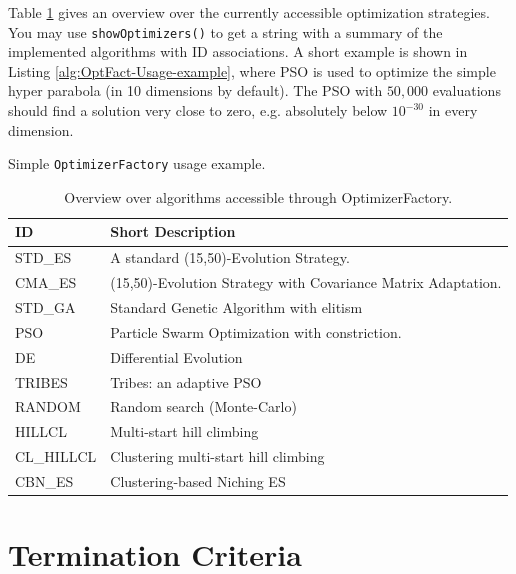 Table \ref{tab:Overview-OptimizerFactory} gives an overview over
the currently accessible optimization strategies. You may use \texttt{showOptimizers()}
to get a string with a summary of the implemented algorithms with
ID associations. A short example is shown in Listing \ref{alg:OptFact-Usage-example},
where PSO is used to optimize the simple hyper parabola (in 10 dimensions
by default). The PSO with $50,000$ evaluations should find a solution
very close to zero, e.g. absolutely below $10^{-30}{}{}$ in every
dimension.

\begin{algorithm}



\caption{Simple \texttt{OptimizerFactory} usage example.\label{alg:OptFact-Usage-example}}
\end{algorithm}


\begin{table}
\begin{tabular}{|l|l|}
\hline 
ID & Short Description\tabularnewline
\hline 
\hline 
STD\_ES & A standard (15,50)-Evolution Strategy.\tabularnewline
CMA\_ES & (15,50)-Evolution Strategy with Covariance Matrix Adaptation.\tabularnewline
STD\_GA & Standard Genetic Algorithm with elitism\tabularnewline
PSO & Particle Swarm Optimization with constriction.\tabularnewline
DE & Differential Evolution\tabularnewline
TRIBES & Tribes: an adaptive PSO\tabularnewline
RANDOM & Random search (Monte-Carlo)\tabularnewline
HILLCL & Multi-start hill climbing\tabularnewline
CL\_HILLCL & Clustering multi-start hill climbing\tabularnewline
CBN\_ES & Clustering-based Niching ES\tabularnewline
\hline 
\end{tabular}

\caption{Overview over algorithms accessible through OptimizerFactory.\label{tab:Overview-OptimizerFactory}}
\end{table}



\section{Termination Criteria\label{sub:Termination-Criteria}}

